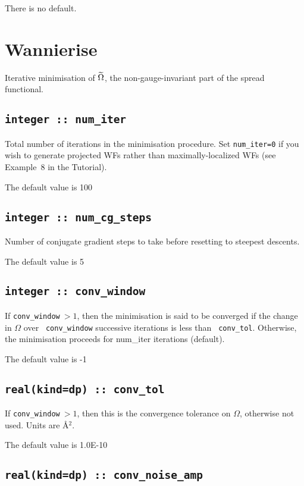 There is no default.


\section{Wannierise}\label{sec:wann_params}
Iterative minimisation of $\widetilde{\Omega}$, the non-gauge-invariant part of the
spread functional.

\subsection[num\_iter]{\tt integer :: num\_iter}

Total number of iterations in the minimisation procedure.
Set {\tt num\_iter=0} if you wish to generate
  projected WFs rather than maximally-localized WFs (see Example~8 in
  the Tutorial).

The default value is 100

\subsection[num\_cg\_steps]{\tt integer :: num\_cg\_steps}

Number of conjugate gradient steps to take before resetting to steepest descents.

The default value is 5

\subsection[conv\_window]{\tt integer :: conv\_window}

If {\tt conv\_window}$\:>1$, then the minimisation is said to be
  converged if the change in $\Omega$ over {\tt
  conv\_window} successive iterations is less than {\tt
  conv\_tol}. Otherwise, the minimisation proceeds for
  {num\_iter} iterations (default).

The default value is -1

\subsection[conv\_tol]{\tt real(kind=dp) :: conv\_tol}

If {\tt conv\_window}$\:>1$, then this is the convergence tolerance on
$\Omega$, otherwise not used. Units are \AA$^2$.

The default value is 1.0E-10

\subsection[conv\_noise\_amp]{\tt real(kind=dp) :: conv\_noise\_amp}


